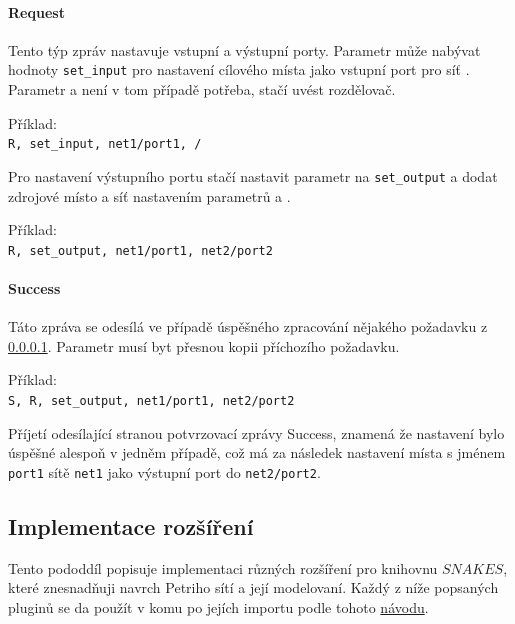 \paragraph{Request} \label{par:request} Tento týp zpráv nastavuje vstupní a výstupní porty. Parametr  může nabývat hodnoty \texttt{set\_input} pro nastavení cílového místa  jako vstupní port pro síť . Parametr  a  není v tom případě potřeba, stačí uvést rozdělovač.

\begin{tabbing}
  Příklad: \= \\
  \>\texttt{R, set\_input, net1/port1, /}
\end{tabbing}

Pro nastavení výstupního portu stačí nastavit parametr  na \texttt{set\_output} a dodat zdrojové místo a síť nastavením parametrů  a .

\begin{tabbing}
  Příklad: \= \\
  \> \texttt{R, set\_output, net1/port1, net2/port2} \\
\end{tabbing}

\paragraph{Success} Táto zpráva se odesílá ve případě úspěšného zpracování nějakého požadavku z \ref{par:request}. Parametr  musí byt přesnou kopii příchozího požadavku.

\begin{tabbing}
  Příklad: \= \\
  \> \texttt{S, R, set\_output, net1/port1, net2/port2} \\
\end{tabbing}

Příjetí odesílající stranou potvrzovací zprávy Success, znamená že nastavení bylo úspěšné alespoň v jedněm případě, což má za následek nastavení místa s jménem \texttt{port1} sítě \texttt{net1} jako výstupní port do \texttt{net2/port2}.

\subsection{Implementace rozšíření}
\label{sec:plug-impl}
Tento pododdíl popisuje implementaci různých rozšíření pro knihovnu $SNAKES$, které znesnadňuji navrch Petriho sítí a její modelovaní. Každý z níže popsaných pluginů se da  použít v komu po jejích importu podle tohoto \href{https://www.ibisc.univ-evry.fr/~fpommereau/SNAKES/first-steps-with-snakes.html}{návodu}.

